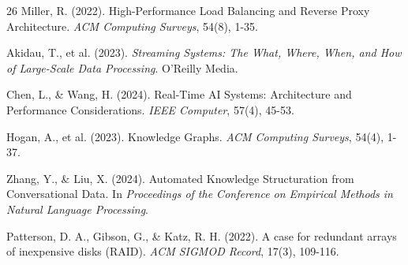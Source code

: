 \documentclass[11pt]{article}
\begin{document}
\begin{thebibliography}{26}
		Miller, R. (2022). High-Performance Load Balancing and Reverse Proxy Architecture. \textit{ACM Computing Surveys}, 54(8), 1-35.
		
		Akidau, T., et al. (2023). \textit{Streaming Systems: The What, Where, When, and How of Large-Scale Data Processing}. O'Reilly Media.
		
		Chen, L., \& Wang, H. (2024). Real-Time AI Systems: Architecture and Performance Considerations. \textit{IEEE Computer}, 57(4), 45-53.
		
		Hogan, A., et al. (2023). Knowledge Graphs. \textit{ACM Computing Surveys}, 54(4), 1-37.
		
		Zhang, Y., \& Liu, X. (2024). Automated Knowledge Structuration from Conversational Data. In \textit{Proceedings of the Conference on Empirical Methods in Natural Language Processing}.
		
		Patterson, D. A., Gibson, G., \& Katz, R. H. (2022). A case for redundant arrays of inexpensive disks (RAID). \textit{ACM SIGMOD Record}, 17(3), 109-116.
	\end{thebibliography}
	
	
\end{document}
